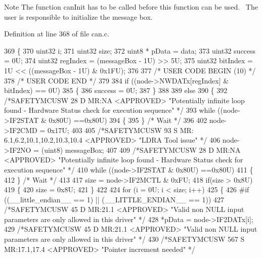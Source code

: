 \begin{DoxyNote}{Note}
The function can\+Init has to be called before this function can be used.~\newline
 The user is responsible to initialize the message box.
\end{DoxyNote}


Definition at line 368 of file can.\+c.


\begin{DoxyCode}
369 \{
370     uint32       i;
371     uint32       size;
372     uint8 * pData    = data;
373     uint32       success  = 0U;
374     uint32       regIndex = (messageBox - 1U) >> 5U;
375     uint32       bitIndex = 1U << ((messageBox - 1U) & 0x1FU);
376 
377 \textcolor{comment}{/* USER CODE BEGIN (10) */}
378 \textcolor{comment}{/* USER CODE END */}
379 
384     \textcolor{keywordflow}{if} ((node->NWDATx[regIndex] & bitIndex) == 0U)
385     \{
386         success = 0U;
387     \}
388 
389     \textcolor{keywordflow}{else}
390     \{
392         \textcolor{comment}{/*SAFETYMCUSW 28 D MR:NA <APPROVED> "Potentially infinite loop found - Hardware Status check for
       execution sequence" */}
393         \textcolor{keywordflow}{while} ((node->IF2STAT & 0x80U) ==0x80U)
394         \{ 
395         \} \textcolor{comment}{/* Wait */}
396     
402         node->IF2CMD = 0x17U;
403         
405         \textcolor{comment}{/*SAFETYMCUSW 93 S MR: 6.1,6.2,10.1,10.2,10.3,10.4 <APPROVED> "LDRA Tool issue" */}
406         node->IF2NO = (uint8) messageBox;
407 
409         \textcolor{comment}{/*SAFETYMCUSW 28 D MR:NA <APPROVED> "Potentially infinite loop found - Hardware Status check for
       execution sequence" */}
410         \textcolor{keywordflow}{while} ((node->IF2STAT & 0x80U) ==0x80U)
411         \{ 
412         \} \textcolor{comment}{/* Wait */}
413 
417         size = node->IF2MCTL & 0xFU;
418         \textcolor{keywordflow}{if}(size > 0x8U)
419         \{
420             size = 0x8U;
421         \}
422         
424         \textcolor{keywordflow}{for} (i = 0U; i < size; i++)
425         \{
426 \textcolor{preprocessor}{#if ((\_\_little\_endian\_\_ == 1) || (\_\_LITTLE\_ENDIAN\_\_ == 1))
}
427             \textcolor{comment}{/*SAFETYMCUSW 45 D MR:21.1 <APPROVED> "Valid non NULL input parameters are only allowed in this
       driver" */}
428             *pData = node->IF2DATx[i];
429             \textcolor{comment}{/*SAFETYMCUSW 45 D MR:21.1 <APPROVED> "Valid non NULL input parameters are only allowed in this
       driver" */}        
430             \textcolor{comment}{/*SAFETYMCUSW 567 S MR:17.1,17.4 <APPROVED> "Pointer increment needed" */}

\end{DoxyCode}
